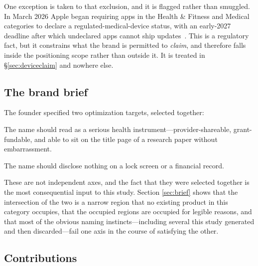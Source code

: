 \documentclass[11pt,a4paper]{article}
\begin{document}
One exception is taken to that exclusion, and it is flagged rather than
smuggled. In March 2026 Apple began requiring apps in the Health \&
Fitness and Medical categories to declare a regulated-medical-device
status, with an early-2027 deadline after which undeclared apps cannot
ship updates~\cite{appledevice}. This is a regulatory fact, but it
constrains what the brand is permitted to \emph{claim}, and therefore
falls inside the positioning scope rather than outside it. It is
treated in \S\ref{sec:deviceclaim} and nowhere else.

\subsection{The brand brief}

The founder specified two optimization targets, selected together:

\begin{description}[leftmargin=1.6em,style=nextline,itemsep=0.35em]
\item[Clinically credible.] The name should read as a serious health
      instrument---provider-shareable, grant-fundable, and able to sit
      on the title page of a research paper without embarrassment.
\item[Discreet and ungendered.] The name should disclose nothing on a
      lock screen or a financial record.
\end{description}

These are not independent axes, and the fact that they were selected
together is the most consequential input to this study. Section
\ref{sec:brief} shows that the intersection of the two is a narrow
region that no existing product in this category occupies, that the
occupied regions are occupied for legible reasons, and that most of the
obvious naming instincts---including several this study generated and
then discarded---fail one axis in the course of satisfying the other.

\subsection{Contributions}
\end{document}
